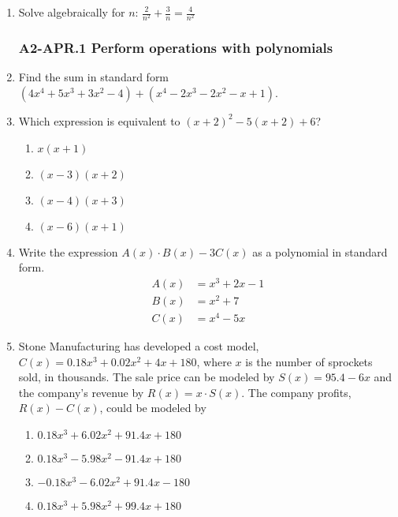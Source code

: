 \documentclass[12pt, twoside]{article}
\begin{document}
\begin{enumerate}[itemsep=0.5cm]
\item Solve algebraically for $n$: $\displaystyle \frac{2}{n^2} + \frac{3}{n} = \frac{4}{n^2}$ %
\vspace{4cm}

\newpage 
\subsubsection*{A2-APR.1 Perform operations with polynomials}
\item Find the sum in standard form $(4x^4+5x^3+3x^2-4) + (x^4-2x^3-2x^2-x+1)$. \vspace{8cm}

\item Which expression is equivalent to $(x + 2)^2 - 5(x + 2) + 6$?
\begin{enumerate}
    \item $x(x + 1)$
    \item $(x - 3)(x + 2)$
    \item $(x - 4)(x + 3)$
    \item $(x - 6)(x + 1)$
\end{enumerate}

\newpage
\item Write the expression $A(x) \cdot B(x) - 3C(x)$ as a polynomial in standard form. %
\begin{align*}
    A(x) &= x^3 + 2x - 1 \\
    B(x) &= x^2 + 7 \\
    C(x) &= x^4 - 5x
\end{align*} \vspace{6cm}

\item Stone Manufacturing has developed a cost model, $C(x) = 0.18x^3 + 0.02x^2 + 4x + 180$, where $x$ is the number of sprockets sold, in thousands. The sale price can be modeled by $S(x) = 95.4 - 6x$ and the company’s revenue by $R(x) = x \cdot S(x)$. The company profits, $R(x) - C(x)$, could be modeled by %
\begin{enumerate}
    \item $0.18x^3 + 6.02x^2 + 91.4x + 180$
    \item $0.18x^3 - 5.98x^2 - 91.4x + 180$
    \item $-0.18x^3 - 6.02x^2 + 91.4x - 180$
    \item $0.18x^3 + 5.98x^2 + 99.4x + 180$
\end{enumerate}


\end{enumerate}
\end{document}
